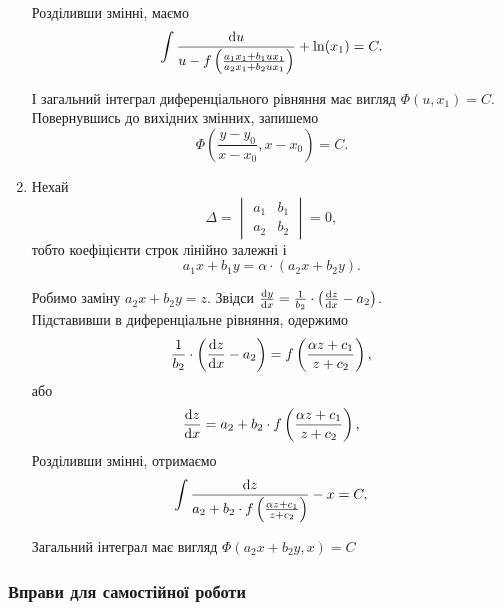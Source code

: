 \begin{enumerate}
	Розділивши змінні, маємо
	\begin{equation}
		\label{eq:1.2.15}
		\int \frac{\mathop{}\!\mathrm{d} u}{u - f \left( \frac{a_1 x_1 + b_1 u x_1}{a_2 x_1 + b_2 u x_1} \right)} + \ln (x_1) = C.
	\end{equation}

	І загальний інтеграл диференціального рівняння має вигляд $\Phi(u, x_1) = C$. Повернувшись до вихідних змінних, запишемо
	\begin{equation}
		\label{eq:1.2.16}
		\Phi \left( \frac{y - y_0}{x - x_0}, x - x_0 \right) = C.
	\end{equation}

	\item Нехай 
	\begin{equation}
		\label{eq:1.2.17}
		\Delta = \begin{vmatrix} a_1 & b_1 \\ a_2 & b_2 \end{vmatrix} = 0,
	\end{equation}
	тобто коефіцієнти строк лінійно залежні і
	\begin{equation}
		\label{eq:1.2.18}
		a_1 x + b_1 y = \alpha \cdot (a_2 x + b_2 y).
	\end{equation}

	Робимо заміну $a_2 x + b_2 y = z$. Звідси $\frac{\mathop{}\!\mathrm{d} y}{\mathop{}\!\mathrm{d} x} = \frac{1}{b_2} \cdot \left( \frac{\mathop{}\!\mathrm{d} z}{\mathop{}\!\mathrm{d} x} - a_2 \right)$. \\

	Підставивши в диференціальне рівняння, одержимо
	\begin{equation}
		\label{eq:1.2.19}
		\frac{1}{b_2} \cdot \left( \frac{\mathop{}\!\mathrm{d} z}{\mathop{}\!\mathrm{d} x} - a_2 \right) = f \left ( \frac{\alpha z + c_1}{z + c_2} \right),
	\end{equation}
	або
	\begin{equation}
		\label{eq:1.2.20}
		\frac{\mathop{}\!\mathrm{d} z}{\mathop{}\!\mathrm{d} x} = a_2 + b_2 \cdot f \left ( \frac{\alpha z + c_1}{z + c_2} \right),
	\end{equation}
	Розділивши змінні, отримаємо
	\begin{equation}
		\label{eq:1.2.21}
		\int \frac{\mathop{}\!\mathrm{d} z}{a_2 + b_2 \cdot f \left ( \frac{\alpha z + c_1}{z + c_2} \right)} - x = C,
	\end{equation}

	Загальний інтеграл має вигляд $\Phi(a_2 x + b_2 y, x) = C$
\end{enumerate}

\subsubsection{Вправи для самостійної роботи}

